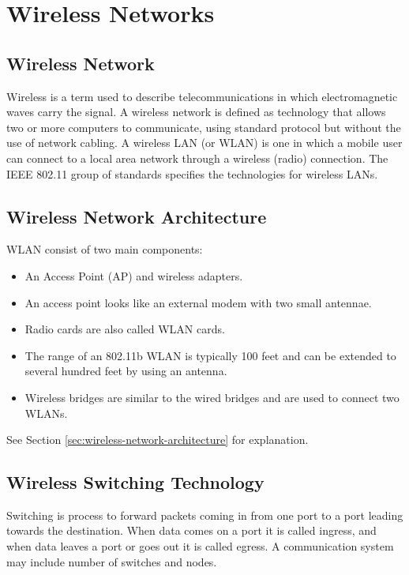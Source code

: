 
\chapter{Wireless Networks}

\section{Wireless Network}
Wireless is a term used to describe telecommunications in which electromagnetic waves carry the signal. A wireless network is defined as technology that allows two or more computers to communicate, using standard protocol but without the use of network cabling. A wireless LAN (or WLAN) is one in which a mobile user can connect to a local area network through a wireless (radio) connection. The IEEE 802.11 group of standards specifies the technologies for wireless LANs.

\section{Wireless Network Architecture}
WLAN consist of two main components: 
\begin{itemize}
	\item An Access Point (AP) and wireless adapters.
	\item An access point looks like an	external modem with two small antennae.
	\item Radio cards are also called WLAN cards. 
	\item The range of an 802.11b WLAN is typically 100 feet and can be extended
	to several hundred feet by using an antenna. 
	\item Wireless bridges are similar to the wired bridges and are used to connect two WLANs.
\end{itemize}

See Section \ref{sec:wireless-network-architecture} for explanation.
 
\section{Wireless Switching Technology}
Switching is process to forward packets coming in from one port to a port leading towards the
destination. When data comes on a port it is called ingress, and when data leaves a port or goes out it
is called egress. A communication system may include number of switches and nodes.

